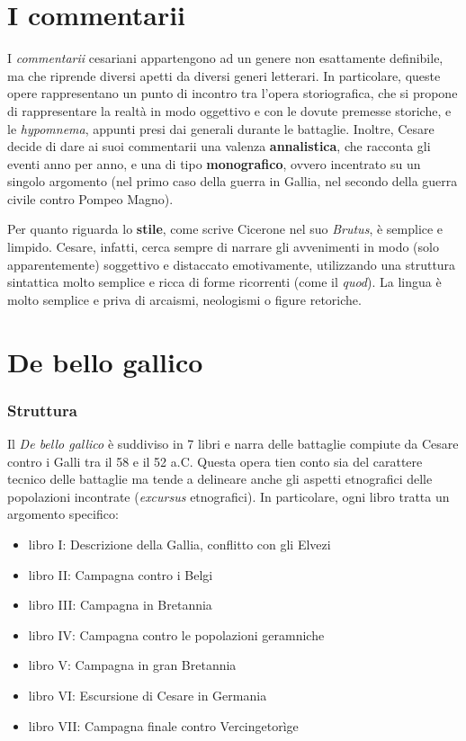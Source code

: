 \documentclass[10pt,a4paper]{article}
\begin{document}
\section{I commentarii}

I \textit{commentarii} cesariani appartengono ad un genere non esattamente definibile, ma che riprende diversi apetti da diversi generi letterari. In particolare, queste opere rappresentano un punto di incontro tra l'opera storiografica, che si propone di rappresentare la realtà in modo oggettivo e con le dovute premesse storiche, e le \textit{hypomnema}, appunti presi dai generali durante le battaglie. Inoltre, Cesare decide di dare ai suoi commentarii una valenza \textbf{annalistica}, che racconta gli eventi anno per anno, e una di tipo \textbf{monografico}, ovvero incentrato su un singolo argomento (nel primo caso della guerra in Gallia, nel secondo della guerra civile contro Pompeo Magno).

Per quanto riguarda lo \textbf{stile}, come scrive Cicerone nel suo \textit{Brutus}, è semplice e limpido. Cesare, infatti, cerca sempre di narrare gli avvenimenti in modo (solo apparentemente) soggettivo e distaccato emotivamente, utilizzando una struttura sintattica molto semplice e ricca di forme ricorrenti (come il \textit{quod}). La lingua è molto semplice e priva di arcaismi, neologismi o figure retoriche.

\section{De bello gallico}

\subsubsection{Struttura}

Il \textit{De bello gallico} è suddiviso in 7 libri e narra delle battaglie compiute da Cesare contro i Galli tra il 58 e il 52 a.C. Questa opera tien conto sia del carattere tecnico delle battaglie ma tende a delineare anche gli aspetti etnografici delle popolazioni incontrate (\textit{excursus} etnografici). In particolare, ogni libro tratta un argomento specifico:
\begin{itemize}
	\item libro I: Descrizione della Gallia, conflitto con gli Elvezi
	\item libro II: Campagna contro i Belgi
	\item libro III: Campagna in Bretannia
	\item libro IV: Campagna contro le popolazioni geramniche
	\item libro V: Campagna in gran Bretannia
	\item libro VI: Escursione di Cesare in Germania
	\item libro VII: Campagna finale contro Vercingetorìge
\end{itemize}
\end{document}
